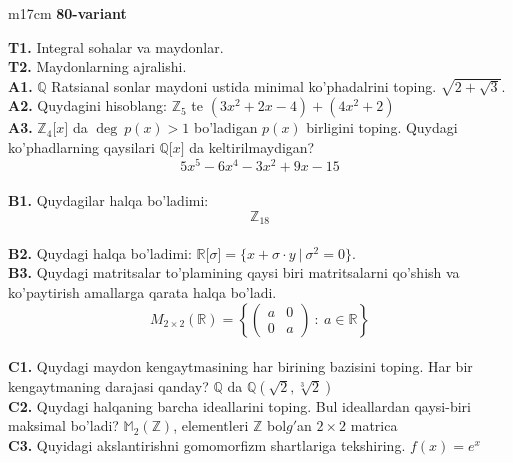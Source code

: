 \documentclass{article}
\begin{document}
\begin{tabular}{m{17cm}}
\textbf{80-variant}
\newline

\textbf{T1.} Integral sohalar va maydonlar. \\
\textbf{T2.} Maydonlarning ajralishi. \\
\textbf{A1.} \(\mathbb{Q}\) Ratsianal sonlar maydoni ustida minimal ko'phadalrini toping.
\(\sqrt{2 + \sqrt{3}}\). \\
\textbf{A2.} Quydagini hisoblang:
\(\mathbb{Z}_{5}\) te \(\left( 3x^{2} + 2x - 4 \right) + \left( 4x^{2} + 2 \right)\) \\
\textbf{A3.} \(\mathbb{Z}_{4}\lbrack x\rbrack\) da \(\deg\ p(x) > 1\) bo'ladigan \(p(x)\) birligini toping. Quydagi ko'phadlarning qaysilari \(\mathbb{Q\lbrack}x\rbrack\) da keltirilmaydigan?
\[5x^{5} - 6x^{4} - 3x^{2} + 9x - 15\] \\
\textbf{B1.} Quydagilar halqa bo'ladimi:
\[\mathbb{Z}_{18}\] \\
\textbf{B2.} Quydagi halqa bo'ladimi:
\(\mathbb{R\lbrack}\sigma\rbrack = \{ x + \sigma \cdot y\ |\ \sigma^{2} = 0\}\). \\
\textbf{B3.} Quydagi matritsalar to'plamining qaysi biri matritsalarni qo'shish va ko'paytirish amallarga qarata halqa bo'ladi.
\[M_{2 \times 2}\mathbb{(R) =}\left\{ \begin{pmatrix}
a & 0 \\
0 & a
\end{pmatrix}\ :\ a \in \mathbb{R} \right\}\] \\
\textbf{C1.} Quydagi maydon kengaytmasining har birining bazisini toping. Har bir kengaytmaning darajasi qanday?
\(\mathbb{Q}\) da \(\mathbb{Q}\left( \sqrt{2},\sqrt[3]{2} \right)\) \\
\textbf{C2.} Quydagi halqaning barcha ideallarini toping. Bul ideallardan qaysi-biri maksimal bo'ladi?
\(\mathbb{M}_{2}\left( \mathbb{Z} \right)\), elementleri \(\mathbb{Z}\) bol\(g'\)an \(2 \times 2\) matrica \\
\textbf{C3.} Quyidagi akslantirishni gomomorfizm shartlariga tekshiring. \(f(x) = e^{x}\) \\

\end{tabular}
\vspace{1cm}
\end{document}

